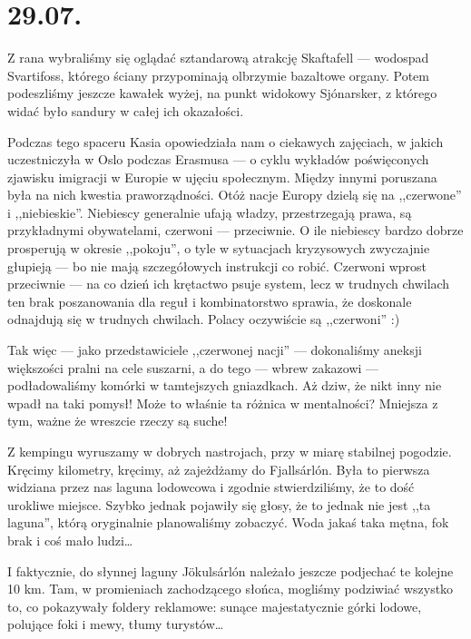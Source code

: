 \chapter*{29.07.}

Z rana wybraliśmy się oglądać sztandarową atrakcję Skaftafell --- wodospad Svartifoss, którego ściany przypominają olbrzymie bazaltowe organy. Potem podeszliśmy jeszcze kawałek wyżej, na punkt widokowy Sjónarsker, z którego widać było sandury w całej ich okazałości.

Podczas tego spaceru Kasia opowiedziała nam o ciekawych zajęciach, w jakich uczestniczyła w Oslo podczas Erasmusa --- o cyklu wykładów poświęconych zjawisku imigracji w Europie w ujęciu społecznym. Między innymi poruszana była na nich kwestia praworządności. Otóż nacje Europy dzielą się na ,,czerwone'' i ,,niebieskie''. Niebiescy generalnie ufają władzy, przestrzegają prawa, są przykładnymi obywatelami, czerwoni --- przeciwnie. O ile niebiescy bardzo dobrze prosperują w okresie ,,pokoju'', o tyle w sytuacjach kryzysowych zwyczajnie głupieją --- bo nie mają szczegółowych instrukcji co robić. Czerwoni wprost przeciwnie --- na co dzień ich krętactwo psuje system, lecz w trudnych chwilach ten brak poszanowania dla reguł i kombinatorstwo sprawia, że doskonale odnajdują się w trudnych chwilach. Polacy oczywiście są ,,czerwoni'' :)

Tak więc --- jako przedstawiciele ,,czerwonej nacji'' --- dokonaliśmy aneksji większości pralni na cele suszarni, a do tego --- wbrew zakazowi --- podładowaliśmy komórki w tamtejszych gniazdkach. Aż dziw, że nikt inny nie wpadł na taki pomysł! Może to właśnie ta różnica w mentalności? Mniejsza z tym, ważne że wreszcie rzeczy są suche!


Z kempingu wyruszamy w dobrych nastrojach, przy w miarę stabilnej pogodzie. Kręcimy kilometry, kręcimy, aż zajeżdżamy do Fjallsárlón. Była to pierwsza widziana przez nas laguna lodowcowa i zgodnie stwierdziliśmy, że to dość urokliwe miejsce. Szybko jednak pojawiły się głosy, że to jednak nie jest ,,ta laguna'', którą oryginalnie planowaliśmy zobaczyć. Woda jakaś taka mętna, fok brak i coś mało ludzi…


I faktycznie, do słynnej laguny Jökulsárlón należało jeszcze podjechać te kolejne 10 km. Tam, w promieniach zachodzącego słońca, mogliśmy podziwiać wszystko to, co pokazywały foldery reklamowe: sunące majestatycznie górki lodowe, polujące foki i mewy, tłumy turystów…

